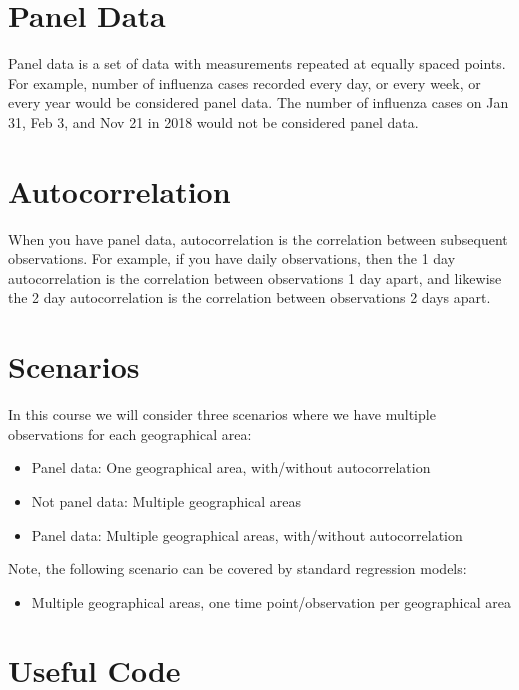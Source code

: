 \documentclass[]{book}
\providecommand{\tightlist}{%
  \setlength{\itemsep}{0pt}\setlength{\parskip}{0pt}}
\begin{document}
\section{Panel Data}\label{panel-data}

Panel data is a set of data with measurements repeated at equally spaced
points. For example, number of influenza cases recorded every day, or
every week, or every year would be considered panel data. The number of
influenza cases on Jan 31, Feb 3, and Nov 21 in 2018 would not be
considered panel data.

\section{Autocorrelation}\label{autocorrelation}

When you have panel data, autocorrelation is the correlation between
subsequent observations. For example, if you have daily observations,
then the 1 day autocorrelation is the correlation between observations 1
day apart, and likewise the 2 day autocorrelation is the correlation
between observations 2 days apart.

\section{Scenarios}\label{scenarios}

In this course we will consider three scenarios where we have multiple
observations for each geographical area:

\begin{itemize}
\tightlist
\item
  Panel data: One geographical area, with/without autocorrelation
\item
  Not panel data: Multiple geographical areas
\item
  Panel data: Multiple geographical areas, with/without autocorrelation
\end{itemize}

Note, the following scenario can be covered by standard regression
models:

\begin{itemize}
\tightlist
\item
  Multiple geographical areas, one time point/observation per
  geographical area
\end{itemize}

\section{Useful Code}\label{useful-code}
\end{document}
